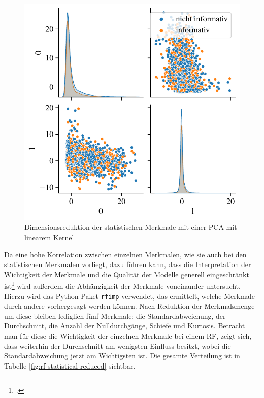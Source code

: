  \begin{figure}[H]
 	\centering
 	\includegraphics[scale=0.9]{pic/statistical-pca-lin.pdf}
	\caption{Dimensionsreduktion der statistischen Merkmale mit einer \ac{PCA} mit linearem Kernel}
	\label{fig:dim-red-statistical}
\end{figure}

Da eine hohe Korrelation zwischen einzelnen Merkmalen, wie sie auch bei den statistischen Merkmalen vorliegt, dazu führen kann, dass die Interpretation der Wichtigkeit der Merkmale und die Qualität der Modelle generell eingeschränkt ist\footcite[Kapitel 8]{Harrison2019} wird außerdem die Abhängigkeit der Merkmale voneinander untersucht. Hierzu wird das Python-Paket \texttt{rfimp} verwendet, das ermittelt, welche Merkmale durch andere vorhergesagt werden können. Nach Reduktion der Merkmalsmenge um diese bleiben lediglich fünf Merkmale: die Standardabweichung, der Durchschnitt, die Anzahl der Nulldurchgänge, Schiefe und Kurtosis. Betracht man für diese die Wichtigkeit der einzelnen Merkmale bei einem \acl{RF}, zeigt sich, dass weiterhin der Durchschnitt am wenigsten Einfluss besitzt, wobei die Standardabweichung jetzt am Wichtigsten ist. Die gesamte Verteilung ist in Tabelle \ref{fig:rf-statistical-reduced} sichtbar.

